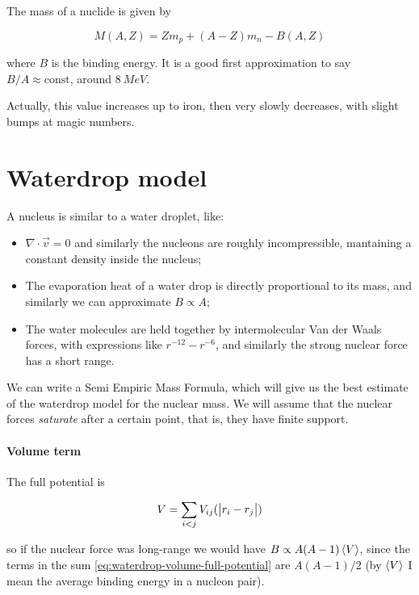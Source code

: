 \documentclass[main.tex]{subfiles}
\begin{document}
The mass of a nuclide is given by

\begin{equation}
M (A, Z) = Z m_p + (A-Z) m_n - B(A, Z)
\end{equation}

 where \(B\) is the binding energy. It is a good first approximation to say \(B/A \approx \text{const}\), around \(\SI{8}{MeV} \).

Actually, this value increases up to iron, then very slowly decreases, with slight bumps at magic numbers.

\section{Waterdrop model}

A nucleus is similar to a water droplet, like:

\begin{itemize}
    \item \(\nabla \cdot \vec{v} = 0  \) and similarly the nucleons are roughly incompressible, mantaining a constant density inside the nucleus;
    \item The evaporation heat of a water drop is directly proportional to its mass, and similarly we can approximate \(B \propto A\);
    \item The water molecules are held together by intermolecular Van der Waals forces, with expressions like \(r ^{-12} - r ^{-6} \), and similarly the strong nuclear force has a short range.
\end{itemize}

We can write a Semi Empiric Mass Formula, which will give us  the best estimate of the waterdrop model for the nuclear mass. We will assume that the nuclear forces \emph{saturate} after a certain point, that is, they have finite support.

\paragraph{Volume term}

The full potential is

\begin{equation} \label{eq:waterdrop-volume-full-potential}
    V = \sum _{i<j} V_{ij} (\abs{r_i - r_j})
\end{equation}

so if the nuclear force was long-range we would have \(B \propto A (A-1) \expval{V} \), since the terms in the sum \eqref{eq:waterdrop-volume-full-potential}  are \(A(A-1)/2\) (by \(\expval{V} \) I mean the average binding energy in a nucleon pair).
\end{document}
